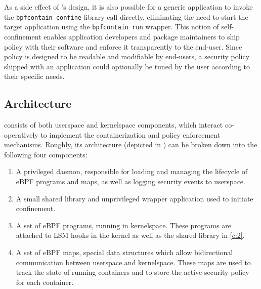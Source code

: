 As a side effect of \bpfcontain{}'s design, it is also possible for a generic
application to invoke the \lstinline[language=c]|bpfcontain_confine| library
call directly, eliminating the need to start the target application using the
\texttt{bpfcontain run} wrapper. This notion of self-confinement enables
application developers and package maintainers to ship \bpfcontain{} policy with
their software and enforce it transparently to the end-user. Since \bpfcontain{}
policy is designed to be readable and modifiable by end-users, a security policy
shipped with an application could optionally be tuned by the user according to
their specific needs.


\subsection{Architecture}

\bpfcontain{} consists of both userspace and kernelspace components, which
interact co-operatively to implement the containerization and policy enforcement
mechanisms. Roughly, its architecture (depicted in ) can
be broken down into the following four components:
\begin{enumerate}[label=\bfseries C\arabic*., ref=C\arabic*, labelindent=1em]

  \item \label{c:1}
  A privileged daemon, responsible for loading and managing the lifecycle of
  eBPF programs and maps, as well as logging security events to userspace.

  \item \label{c:2}
  A small shared library and unprivileged wrapper application used to initiate
  confinement.

  \item \label{c:3}
  A set of eBPF programs, running in kernelspace. These programs are attached to
  LSM hooks in the kernel as well as the shared library in \ref{c:2}.

  \item \label{c:4}
  A set of eBPF maps, special data structures which allow bidirectional
  communication between userspace and kernelspace. These maps are used to track
  the state of running containers and to store the active security policy for
  each container.
\end{enumerate}

